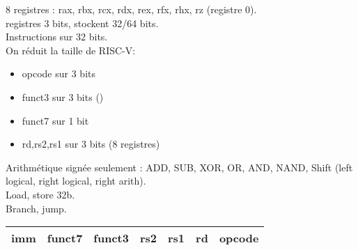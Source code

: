 \documentclass[a4paper]{article}
\begin{document}
    8 registres : rax, rbx, rcx, rdx, rex, rfx, rhx, rz (registre 0).\\
    registres 3 bits, stockent 32/64 bits.\\
    Instructions sur 32 bits.\\
    On réduit la taille de RISC-V:\begin{itemize}
        \item opcode sur 3 bits
        \item funct3 sur 3 bits ()
        \item funct7 sur 1 bit 
        \item rd,rs2,rs1 sur 3 bits (8 registres)
    \end{itemize}
    Arithmétique signée seulement : ADD, SUB, XOR, OR, AND, NAND, Shift (left logical, right logical, right arith).\\
    Load, store 32b.\\
    Branch, jump.

    \begin{tabular}{|c|c|c|c|c|c|c|}
        \hline
        imm & funct7 & funct3 & rs2 & rs1 & rd & opcode \\
        \hline
    \end{tabular}
\end{document}
